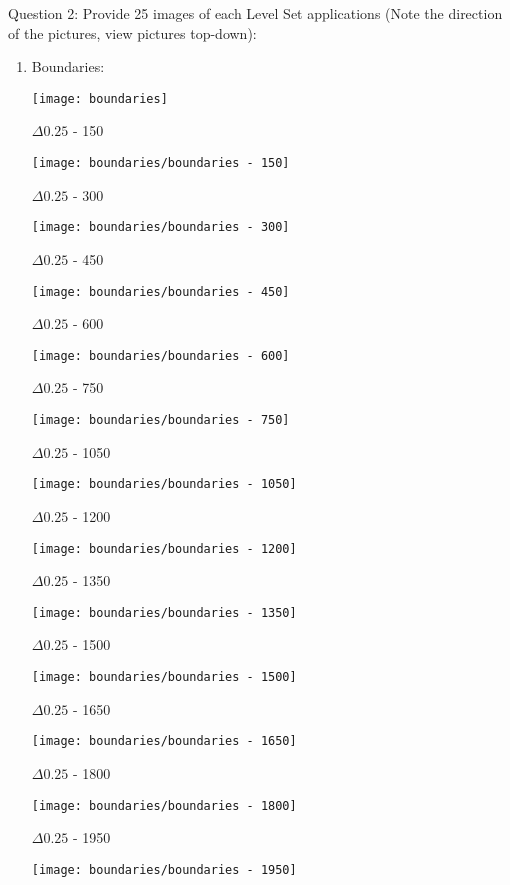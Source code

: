 \newpage
\item Question 2: Provide 25 images of each Level Set applications (Note the direction of the pictures, view pictures top-down):

\begin{enumerate}
  \item Boundaries:
  \begin{center}
    \texttt{[image: boundaries]}
  \end{center}

    \begin{multicols}{3}
    \begin{center}
    $\Delta 0.25$ - 150

    \texttt{[image: boundaries/boundaries - 150]}

    $\Delta 0.25$ - 300

    \texttt{[image: boundaries/boundaries - 300]}

    $\Delta 0.25$ - 450

    \texttt{[image: boundaries/boundaries - 450]}

    $\Delta 0.25$ - 600

    \texttt{[image: boundaries/boundaries - 600]}

    $\Delta 0.25$ - 750

    \texttt{[image: boundaries/boundaries - 750]}

    $\Delta 0.25$ - 1050

    \texttt{[image: boundaries/boundaries - 1050]}

    $\Delta 0.25$ - 1200

    \texttt{[image: boundaries/boundaries - 1200]}

    $\Delta 0.25$ - 1350

    \texttt{[image: boundaries/boundaries - 1350]}

    $\Delta 0.25$ - 1500

    \texttt{[image: boundaries/boundaries - 1500]}

    $\Delta 0.25$ - 1650

    \texttt{[image: boundaries/boundaries - 1650]}

    $\Delta 0.25$ - 1800

    \texttt{[image: boundaries/boundaries - 1800]}

    $\Delta 0.25$ - 1950

    \texttt{[image: boundaries/boundaries - 1950]}


\end{center}
\end{multicols}
\end{enumerate}
